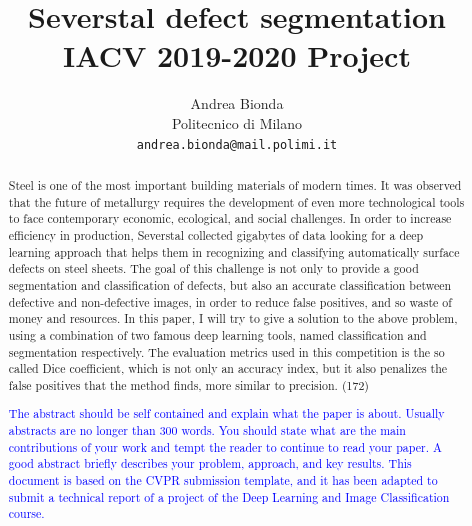 \documentclass[10pt,twocolumn,letterpaper]{article}
\begin{document}
\title{Severstal defect segmentation \\ IACV 2019-2020 Project} 

\author{Andrea Bionda\\
Politecnico di Milano\\
{\tt\small andrea.bionda@mail.polimi.it}}

\maketitle

\begin{abstract}
   Steel is one of the most important building materials of modern times. It was observed that the future of metallurgy requires the development of even more technological tools to face contemporary economic, ecological, and social challenges. 
   In order to increase efficiency in production, Severstal collected gigabytes of data looking for a deep learning approach that helps them in recognizing and classifying automatically surface defects on steel sheets.
   The goal of this challenge is not only to provide a good segmentation and classification of defects, but also an accurate classification between defective and non-defective images, in order to reduce false positives, and so waste of money and resources.
   In this paper, I will try to give a solution to the above problem, using a combination of two famous deep learning tools, named classification and segmentation respectively.
   The evaluation metrics used in this competition is the so called Dice coefficient, which is not only an accuracy index, but it also penalizes the false positives that the method finds, more similar to precision. (172)

   \textcolor{blue}{
   The abstract should be self contained and explain what the paper is about. Usually abstracts are no longer than 300 words. You should state what are the main contributions of your work and tempt the reader to continue to read your paper. A good abstract briefly describes your problem, approach, and key results. This document is based on the CVPR submission template, and it has been adapted to submit a technical report of a project of the Deep Learning and Image Classification course.}
\end{abstract}

\end{document}
